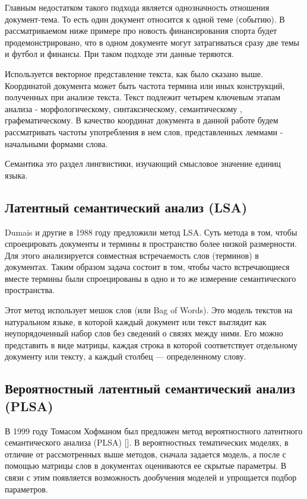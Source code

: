 Главным недостатком такого подхода является однозначность отношения документ-тема. То есть один документ относится к одной теме (событию). В рассматриваемом ниже примере про новость финансирования спорта будет продемонстрировано, что в одном документе могут затрагиваться сразу две темы и футбол и финансы. При таком подходе эти данные теряются.

Используется векторное представление текста, как было сказано выше. Координатой документа может быть частота термина или иных конструкций, полученных при анализе текста. Текст подлежит четырем ключевым этапам анализа - морфологическому, синтаксическому, семантическому \cite{Klyshinskiy2}, графематическому. В качество координат документа в данной работе будем рассматривать частоты употребления в нем слов, представленных леммами - начальными формами слова.

Семантика это раздел лингвистики, изучающий смысловое значение единиц языка.

\subsection{Латентный семантический анализ (LSA)}

Dumais и другие \cite{Dumais1} в 1988 году предложили метод LSA. Суть метода в том, чтобы спроецировать документы и термины в пространство более низкой размерности. Для этого анализируется совместная встречаемость слов (терминов) в документах. Таким образом задача состоит в том, чтобы часто встречающиеся вместе термины были спроецированы в одно и то же измерение семантического пространства.

Этот метод использует мешок слов (или Bag of Words). Это модель текстов на натуральном языке, в которой каждый документ или текст выглядит как неупорядоченный набор слов без сведений о связях между ними. Его можно представить в виде матрицы, каждая строка в которой соответствует отдельному документу или тексту, а каждый столбец — определенному слову.

\subsection{Вероятностный латентный семантический анализ (PLSA)}

В 1999 году Томасом Хофманом был предложен метод вероятностного латентного семантического анализа (PLSA) [\todo{}]. В вероятностных тематических моделях, в отличие от рассмотренных выше методов, сначала задается модель, а после с помощью матрицы слов в документах оцениваются ее скрытые параметры. В связи с этим появляется возможность дообучения моделей и упрощается подбор параметров.

